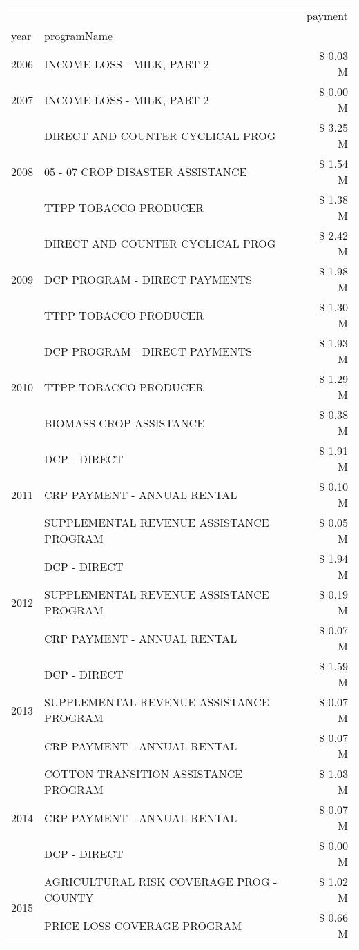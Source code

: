\begin{tabular}{llr}
\toprule
 &  & payment \\
year & programName &  \\
\midrule
2006 & INCOME LOSS - MILK, PART 2 & \$ 0.03 M \\
\cline{1-3}
2007 & INCOME LOSS - MILK, PART 2 & \$ 0.00 M \\
\cline{1-3}
\multirow[t]{3}{*}{2008} & DIRECT AND COUNTER CYCLICAL PROG & \$ 3.25 M \\
 & 05 - 07 CROP DISASTER ASSISTANCE & \$ 1.54 M \\
 & TTPP TOBACCO PRODUCER & \$ 1.38 M \\
\cline{1-3}
\multirow[t]{3}{*}{2009} & DIRECT AND COUNTER CYCLICAL PROG & \$ 2.42 M \\
 & DCP PROGRAM - DIRECT PAYMENTS & \$ 1.98 M \\
 & TTPP TOBACCO PRODUCER & \$ 1.30 M \\
\cline{1-3}
\multirow[t]{3}{*}{2010} & DCP PROGRAM - DIRECT PAYMENTS & \$ 1.93 M \\
 & TTPP TOBACCO PRODUCER & \$ 1.29 M \\
 & BIOMASS CROP ASSISTANCE & \$ 0.38 M \\
\cline{1-3}
\multirow[t]{3}{*}{2011} & DCP - DIRECT & \$ 1.91 M \\
 & CRP PAYMENT - ANNUAL RENTAL & \$ 0.10 M \\
 & SUPPLEMENTAL REVENUE ASSISTANCE PROGRAM & \$ 0.05 M \\
\cline{1-3}
\multirow[t]{3}{*}{2012} & DCP - DIRECT & \$ 1.94 M \\
 & SUPPLEMENTAL REVENUE ASSISTANCE PROGRAM & \$ 0.19 M \\
 & CRP PAYMENT - ANNUAL RENTAL & \$ 0.07 M \\
\cline{1-3}
\multirow[t]{3}{*}{2013} & DCP - DIRECT & \$ 1.59 M \\
 & SUPPLEMENTAL REVENUE ASSISTANCE PROGRAM & \$ 0.07 M \\
 & CRP PAYMENT - ANNUAL RENTAL & \$ 0.07 M \\
\cline{1-3}
\multirow[t]{3}{*}{2014} & COTTON TRANSITION ASSISTANCE PROGRAM & \$ 1.03 M \\
 & CRP PAYMENT - ANNUAL RENTAL & \$ 0.07 M \\
 & DCP - DIRECT & \$ 0.00 M \\
\cline{1-3}
\multirow[t]{3}{*}{2015} & AGRICULTURAL RISK COVERAGE PROG - COUNTY & \$ 1.02 M \\
 & PRICE LOSS COVERAGE PROGRAM & \$ 0.66 M \\

\end{tabular}

